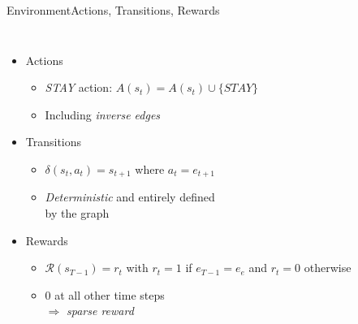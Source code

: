 \documentclass[table]{beamer}
\begin{document}
\begin{frame}{Environment}{Actions, Transitions, Rewards}
  \begin{columns}[T]
  \begin{itemize}
    \item Actions
    \begin{itemize}
      \item \textit{STAY} action: $A(s_t) = A(s_t) \cup \{STAY\}$
      \item Including \emph{inverse edges}
    \end{itemize}
    \item<2-> Transitions
    \begin{itemize}
      \item $\delta(s_t, a_t) = s_{t+1}$ where $a_t = e_{t+1}$
      \item \emph{Deterministic} and entirely defined\\by the graph
    \end{itemize}
    \item<3-> Rewards
    \begin{itemize}
      \item $\mathcal{R}(s_{T-1}) = r_t$ with $r_t = 1$ if \emph{$e_{T-1} = e_e$} and $r_t = 0$ otherwise
      \item $0$ at all other time steps\\
      $\Rightarrow$ \emph{sparse reward}
    \end{itemize}
  \end{itemize}
  

\end{columns}
\end{frame}
\end{document}
